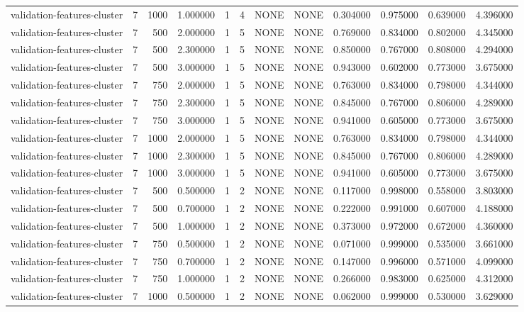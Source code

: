 \begin{tabular}{lrrrllllrrrr}
validation-features-cluster & 7 & 1000 & 1.000000 & 1 & 4 & NONE & NONE & 0.304000 & 0.975000 & 0.639000 & 4.396000 \\
validation-features-cluster & 7 & 500 & 2.000000 & 1 & 5 & NONE & NONE & 0.769000 & 0.834000 & 0.802000 & 4.345000 \\
validation-features-cluster & 7 & 500 & 2.300000 & 1 & 5 & NONE & NONE & 0.850000 & 0.767000 & 0.808000 & 4.294000 \\
validation-features-cluster & 7 & 500 & 3.000000 & 1 & 5 & NONE & NONE & 0.943000 & 0.602000 & 0.773000 & 3.675000 \\
validation-features-cluster & 7 & 750 & 2.000000 & 1 & 5 & NONE & NONE & 0.763000 & 0.834000 & 0.798000 & 4.344000 \\
validation-features-cluster & 7 & 750 & 2.300000 & 1 & 5 & NONE & NONE & 0.845000 & 0.767000 & 0.806000 & 4.289000 \\
validation-features-cluster & 7 & 750 & 3.000000 & 1 & 5 & NONE & NONE & 0.941000 & 0.605000 & 0.773000 & 3.675000 \\
validation-features-cluster & 7 & 1000 & 2.000000 & 1 & 5 & NONE & NONE & 0.763000 & 0.834000 & 0.798000 & 4.344000 \\
validation-features-cluster & 7 & 1000 & 2.300000 & 1 & 5 & NONE & NONE & 0.845000 & 0.767000 & 0.806000 & 4.289000 \\
validation-features-cluster & 7 & 1000 & 3.000000 & 1 & 5 & NONE & NONE & 0.941000 & 0.605000 & 0.773000 & 3.675000 \\
validation-features-cluster & 7 & 500 & 0.500000 & 1 & 2 & NONE & NONE & 0.117000 & 0.998000 & 0.558000 & 3.803000 \\
validation-features-cluster & 7 & 500 & 0.700000 & 1 & 2 & NONE & NONE & 0.222000 & 0.991000 & 0.607000 & 4.188000 \\
validation-features-cluster & 7 & 500 & 1.000000 & 1 & 2 & NONE & NONE & 0.373000 & 0.972000 & 0.672000 & 4.360000 \\
validation-features-cluster & 7 & 750 & 0.500000 & 1 & 2 & NONE & NONE & 0.071000 & 0.999000 & 0.535000 & 3.661000 \\
validation-features-cluster & 7 & 750 & 0.700000 & 1 & 2 & NONE & NONE & 0.147000 & 0.996000 & 0.571000 & 4.099000 \\
validation-features-cluster & 7 & 750 & 1.000000 & 1 & 2 & NONE & NONE & 0.266000 & 0.983000 & 0.625000 & 4.312000 \\
validation-features-cluster & 7 & 1000 & 0.500000 & 1 & 2 & NONE & NONE & 0.062000 & 0.999000 & 0.530000 & 3.629000 \\

\end{tabular}
